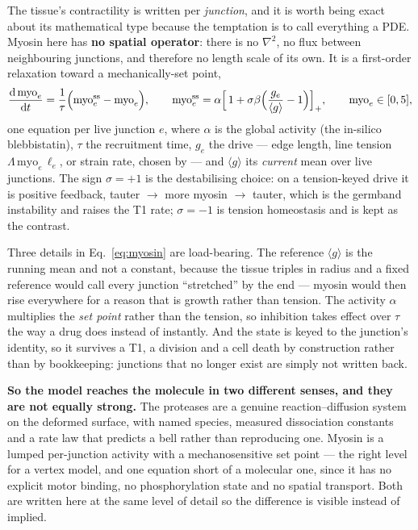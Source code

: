 The tissue's contractility is written per \emph{junction}, and it is worth being exact about its
mathematical type because the temptation is to call everything a PDE. Myosin here has \textbf{no
spatial operator}: there is no $\nabla^2$, no flux between neighbouring junctions, and therefore no
length scale of its own. It is a first-order relaxation toward a mechanically-set point,
%
\begin{equation}
\frac{\mathrm d\,\mathrm{myo}_e}{\mathrm dt}
  = \frac{1}{\tau}\Bigl(\mathrm{myo}^{\rm ss}_e - \mathrm{myo}_e\Bigr),
\qquad
\mathrm{myo}^{\rm ss}_e = \alpha\Bigl[\,1 + \sigma\beta\Bigl(\frac{g_e}{\langle g\rangle}-1\Bigr)\Bigr]_+,
\qquad \mathrm{myo}_e\in[0,5],
\label{eq:myosin}
\end{equation}
%
one equation per live junction $e$, where $\alpha$ is the global activity (the in-silico
blebbistatin), $\tau$ the recruitment time, $g_e$ the drive --- edge length, line tension
$\Lambda\,\mathrm{myo}_e\,\ell_e$, or strain rate, chosen by  --- and $\langle
g\rangle$ its \emph{current} mean over live junctions. The sign $\sigma=+1$ is the destabilising
choice: on a tension-keyed drive it is positive feedback, tauter $\to$ more myosin $\to$ tauter, which
is the germband instability and raises the T1 rate; $\sigma=-1$ is tension homeostasis and is kept as
the contrast.

Three details in Eq.~\eqref{eq:myosin} are load-bearing. The reference $\langle g\rangle$ is the
running mean and not a constant, because the tissue triples in radius and a fixed reference would call
every junction ``stretched'' by the end --- myosin would then rise everywhere for a reason that is
growth rather than tension. The activity $\alpha$ multiplies the \emph{set point} rather than the
tension, so inhibition takes effect over $\tau$ the way a drug does instead of instantly. And the
state is keyed to the junction's identity, so it survives a T1, a division and a cell death by
construction rather than by bookkeeping: junctions that no longer exist are simply not written back.

\textbf{So the model reaches the molecule in two different senses, and they are not equally strong.}
The proteases are a genuine reaction--diffusion system on the deformed surface, with named species,
measured dissociation constants and a rate law that predicts a bell rather than reproducing one.
Myosin is a lumped per-junction activity with a mechanosensitive set point --- the right level for a
vertex model, and one equation short of a molecular one, since it has no explicit motor binding, no
phosphorylation state and no spatial transport. Both are written here at the same level of detail so
the difference is visible instead of implied.
